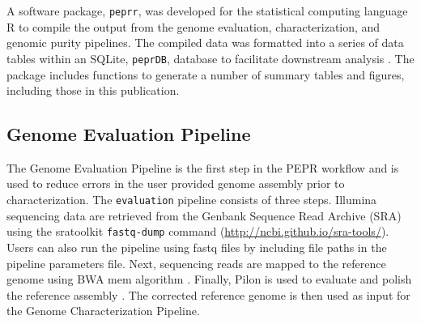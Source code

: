 \documentclass[smallextended]{svjour3}\usepackage[]{graphicx}\usepackage[]{color}
\begin{document}
A software package, \texttt{peprr}, was developed for the statistical computing language R \cite{R2015} to compile the output from the genome evaluation, characterization, and genomic purity pipelines. 
The compiled data was formatted into a series of data tables within an SQLite, \texttt{peprDB}, database to facilitate downstream analysis \cite{wickham2014tidy}. 
The package includes functions to generate a number of summary tables and figures, including those in this publication.


\subsection{Genome Evaluation Pipeline}
\label{method:2}
The Genome Evaluation Pipeline is the first step in the PEPR workflow and is used to reduce errors in the user provided genome assembly prior to characterization. 
The \texttt{evaluation} pipeline consists of three steps. 
Illumina sequencing data are retrieved from the Genbank Sequence Read Archive (SRA) using the sratoolkit \texttt{fastq-dump} command (\url{http://ncbi.github.io/sra-tools/}). 
Users can also run the pipeline using fastq files by including file paths in the pipeline parameters file. 
Next, sequencing reads are mapped to the reference genome using BWA mem algorithm \cite{Li2013c}. 
Finally, Pilon is used to evaluate and polish the reference assembly \cite{Walker2014}. 
The corrected reference genome is then used as input for the Genome Characterization Pipeline.
\end{document}
